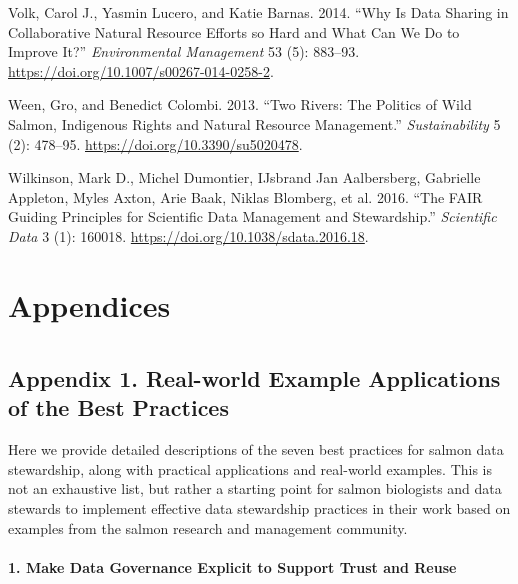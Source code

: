 \documentclass[
  letterpaper,
  DIV=11,
  numbers=noendperiod]{scrartcl}
\makeatletter
\let\oldparagraph\paragraph
\renewcommand{\paragraph}{
    \@ifstar
      \xxxParagraphStar
      \xxxParagraphNoStar
  }
\newcommand{\xxxParagraphStar}[1]{\oldparagraph*{#1}\mbox{}}
\newcommand{\xxxParagraphNoStar}[1]{\oldparagraph{#1}\mbox{}}
\newlength{\cslhangindent}
\newenvironment{CSLReferences}[2] %
 {\begin{list}{}{%
  \setlength{\itemindent}{0pt}
  \setlength{\leftmargin}{0pt}
  \setlength{\parsep}{0pt}
  \ifodd #1
   \setlength{\leftmargin}{\cslhangindent}
   \setlength{\itemindent}{-1\cslhangindent}
  \fi
  \setlength{\itemsep}{#2\baselineskip}}}
 {\end{list}}
\makeatother
\begin{document}
\begin{CSLReferences}{1}{0}
Volk, Carol J., Yasmin Lucero, and Katie Barnas. 2014. {``Why Is Data
Sharing in Collaborative Natural Resource Efforts so Hard and What Can
We Do to Improve It?''} \emph{Environmental Management} 53 (5): 883--93.
\url{https://doi.org/10.1007/s00267-014-0258-2}.

Ween, Gro, and Benedict Colombi. 2013. {``Two Rivers: The Politics of
Wild Salmon, Indigenous Rights and Natural Resource Management.''}
\emph{Sustainability} 5 (2): 478--95.
\url{https://doi.org/10.3390/su5020478}.

Wilkinson, Mark D., Michel Dumontier, IJsbrand Jan Aalbersberg,
Gabrielle Appleton, Myles Axton, Arie Baak, Niklas Blomberg, et al.
2016. {``The FAIR Guiding Principles for Scientific Data Management and
Stewardship.''} \emph{Scientific Data} 3 (1): 160018.
\url{https://doi.org/10.1038/sdata.2016.18}.

\end{CSLReferences}

\section{Appendices}\label{appendices}

\section{}\label{section}

\subsection{Appendix 1. Real-world Example Applications of the Best
Practices}\label{appendix-1.-real-world-example-applications-of-the-best-practices}

Here we provide detailed descriptions of the seven best practices for
salmon data stewardship, along with practical applications and
real-world examples. This is not an exhaustive list, but rather a
starting point for salmon biologists and data stewards to implement
effective data stewardship practices in their work based on examples
from the salmon research and management community.

\paragraph{\texorpdfstring{\textbf{1. Make Data Governance Explicit to
Support Trust and
Reuse}}{1. Make Data Governance Explicit to Support Trust and Reuse}}\label{make-data-governance-explicit-to-support-trust-and-reuse}
\end{document}
